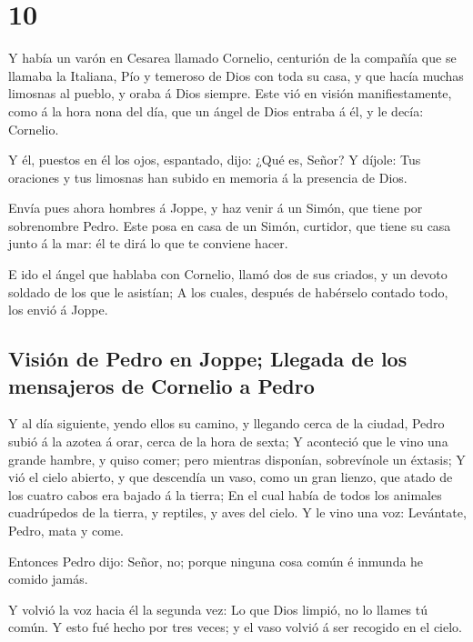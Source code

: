 \hypertarget{section-9}{%
\section{10}\label{section-9}}

 Y había un varón en Cesarea llamado Cornelio, centurión de
la compañía que se llamaba la Italiana,  Pío y temeroso de
Dios con toda su casa, y que hacía muchas limosnas al pueblo, y oraba á
Dios siempre.  Este vió en visión manifiestamente, como á la
hora nona del día, que un ángel de Dios entraba á él, y le decía:
Cornelio.

 Y él, puestos en él los ojos, espantado, dijo: ¿Qué es,
Señor? Y díjole: Tus oraciones y tus limosnas han subido en memoria á la
presencia de Dios.

 Envía pues ahora hombres á Joppe, y haz venir á un Simón,
que tiene por sobrenombre Pedro.  Este posa en casa de un
Simón, curtidor, que tiene su casa junto á la mar: él te dirá lo que te
conviene hacer.

 E ido el ángel que hablaba con Cornelio, llamó dos de sus
criados, y un devoto soldado de los que le asistían;  A los
cuales, después de habérselo contado todo, los envió á Joppe.

\hypertarget{visiuxf3n-de-pedro-en-joppe-llegada-de-los-mensajeros-de-cornelio-a-pedro}{%
\subsection{Visión de Pedro en Joppe; Llegada de los mensajeros de
Cornelio a
Pedro}\label{visiuxf3n-de-pedro-en-joppe-llegada-de-los-mensajeros-de-cornelio-a-pedro}}

 Y al día siguiente, yendo ellos su camino, y llegando cerca
de la ciudad, Pedro subió á la azotea á orar, cerca de la hora de sexta;
 Y aconteció que le vino una grande hambre, y quiso comer;
pero mientras disponían, sobrevínole un éxtasis;  Y vió el
cielo abierto, y que descendía un vaso, como un gran lienzo, que atado
de los cuatro cabos era bajado á la tierra;  En el cual
había de todos los animales cuadrúpedos de la tierra, y reptiles, y aves
del cielo.  Y le vino una voz: Levántate, Pedro, mata y
come.

 Entonces Pedro dijo: Señor, no; porque ninguna cosa común
é inmunda he comido jamás.

 Y volvió la voz hacia él la segunda vez: Lo que Dios
limpió, no lo llames tú común.  Y esto fué hecho por tres
veces; y el vaso volvió á ser recogido en el cielo.

